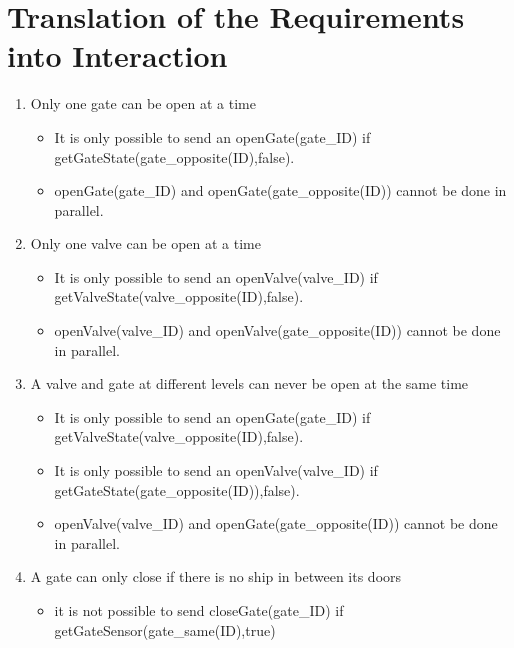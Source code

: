\section{Translation of the Requirements into Interaction}
\begin{enumerate}
	\item Only one gate can be open at a time
	
		\begin{itemize}
			\item It is only possible to send an openGate(gate\_ID) if getGateState(gate\_opposite(ID),false).
			\item openGate(gate\_ID) and openGate(gate\_opposite(ID)) cannot be done in parallel.
			
		\end{itemize}
	
	\item Only one valve can be open at a time
	
		\begin{itemize}
			\item It is only possible to send an openValve(valve\_ID) if getValveState(valve\_opposite(ID),false).
			\item openValve(valve\_ID) and openValve(gate\_opposite(ID)) cannot be done in parallel.
		\end{itemize}
	
	\item A valve and gate at different levels can never be open at the same time
		\begin{itemize}
			\item It is only possible to send an openGate(gate\_ID) if getValveState(valve\_opposite(ID),false).
			\item It is only possible to send an openValve(valve\_ID) if getGateState(gate\_opposite(ID)),false).
			\item openValve(valve\_ID) and openGate(gate\_opposite(ID)) cannot be done in parallel.
		\end{itemize}
	
	
	\item A gate can only close if there is no ship in between its doors
	\begin{itemize}
		\item it is not possible to send closeGate(gate\_ID) if getGateSensor(gate\_same(ID),true)
	\end{itemize}
	

\end{enumerate}
